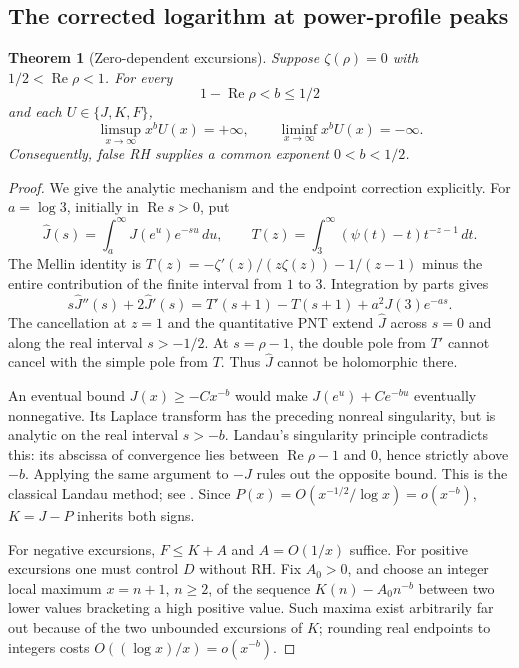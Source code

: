 \documentclass[11pt]{article}
\newtheorem{theorem}{Theorem}[section]
\theoremstyle{definition}
\begin{document}
\begin{samepage}
\subsection{The corrected logarithm at power-profile peaks}\label{sec:excursions}
\begin{theorem}[Zero-dependent excursions]\label{thm:power-excursions}
Suppose $\zeta(\rho)=0$ with $1/2<\operatorname{Re}\rho<1$.
For every
\[
 1-\operatorname{Re}\rho<b\le1/2
\]
and each $U\in\{J,K,F\}$,
\[
 \limsup_{x\to\infty}x^bU(x)=+\infty,\qquad
 \liminf_{x\to\infty}x^bU(x)=-\infty.
\]
Consequently, false RH supplies a common exponent $0<b<1/2$.
\end{theorem}
\end{samepage}
\begin{proof}
We give the analytic mechanism and the endpoint correction explicitly.
For $a=\log3$, initially in $\operatorname{Re}s>0$, put
\[
 \widehat J(s)=\int_a^\infty J(e^u)e^{-su}\,du,\qquad
 T(z)=\int_3^\infty(\psi(t)-t)t^{-z-1}\,dt.
\]
The Mellin identity is
$T(z)=-\zeta'(z)/(z\zeta(z))-1/(z-1)$ minus the entire contribution
of the finite interval from $1$ to $3$. Integration by parts gives
\begin{equation}\label{eq:landau-ode}
 s\widehat J''(s)+2\widehat J'(s)
 =T'(s+1)-T(s+1)+a^2J(3)e^{-as}.
\end{equation}
The cancellation at $z=1$ and the quantitative PNT extend
$\widehat J$ across $s=0$ and along the real interval $s>-1/2$.
At $s=\rho-1$, the double pole from $T'$ cannot cancel with the
simple pole from $T$. Thus $\widehat J$ cannot be holomorphic there.

An eventual bound $J(x)\ge-Cx^{-b}$ would make
$J(e^u)+Ce^{-bu}$ eventually nonnegative. Its Laplace transform has
the preceding nonreal singularity, but is analytic on the real
interval $s>-b$. Landau's singularity principle contradicts this:
its abscissa of convergence lies between
$\operatorname{Re}\rho-1$ and $0$, hence strictly above $-b$.
Applying the same argument to $-J$ rules out the opposite bound.
This is the classical Landau method; see \cite[Theorem~3]{Lay}.
Since $P(x)=O(x^{-1/2}/\log x)=o(x^{-b})$, $K=J-P$ inherits both signs.

For negative excursions, $F\le K+A$ and $A=O(1/x)$ suffice.
For positive excursions one must control $D$ without RH.
Fix $A_0>0$, and choose an integer local maximum $x=n+1$, $n\ge2$,
of the sequence $K(n)-A_0n^{-b}$ between two lower values bracketing a high positive value. Such maxima exist arbitrarily far out
because of the two unbounded excursions of $K$; rounding real
endpoints to integers costs $O((\log x)/x)=o(x^{-b})$.


\end{proof}
\end{document}
